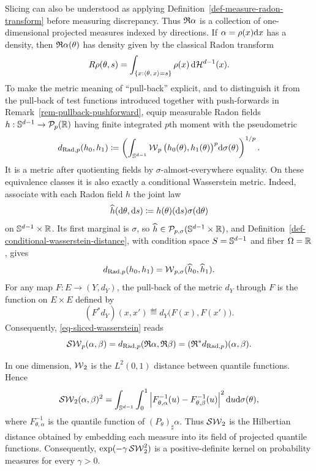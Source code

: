 	Slicing can also be understood as applying Definition~\ref{def-measure-radon-transform} before measuring discrepancy. Thus $\mathfrak R\alpha$ is a collection of one-dimensional projected measures indexed by directions. If $\alpha=\rho(x)\mathrm{d} x$ has a density, then $\mathfrak R\alpha(\theta)$ has density given by the classical Radon transform
	\[
		R\rho(\theta,s)
		=
		\int_{\{x:\langle \theta,\,x\rangle=s\}}\rho(x)\,\mathrm{d}\mathcal H^{d-1}(x).
	\]
	To make the metric meaning of ``pull-back'' explicit, and to distinguish it from the pull-back of test functions introduced together with push-forwards in Remark~\ref{rem-pullback-pushforward}, equip measurable Radon fields $h:\mathbb{S}^{d-1}\to\mathcal{P}_p(\mathbb{R})$ having finite integrated $p$th moment with the pseudometric
	\[
		d_{\mathrm{Rad},p}(h_0,h_1)
		\coloneqq
		\left(
			\int_{\mathbb{S}^{d-1}}
			\operatorname{\mathcal{W}}_p\big(h_0(\theta),h_1(\theta)\big)^p
			\mathrm{d}\sigma(\theta)
		\right)^{1/p}.
	\]
	It is a metric after quotienting fields by $\sigma$-almost-everywhere equality. On these equivalence classes it is also exactly a conditional Wasserstein metric. Indeed, associate with each Radon field $h$ the joint law
	\[
		\widehat h(\mathrm{d}\theta,\mathrm{d} s)
		\coloneqq
		h(\theta)(\mathrm{d} s)\sigma(\mathrm{d}\theta)
	\]
	on $\mathbb{S}^{d-1}\times\mathbb{R}$. Its first marginal is $\sigma$, so $\widehat h\in\mathcal{P}_{p,\sigma}(\mathbb{S}^{d-1}\times\mathbb{R})$, and Definition~\ref{def-conditional-wasserstein-distance}, with condition space $S=\mathbb{S}^{d-1}$ and fiber $\Omega=\mathbb{R}$, gives
	\[
		d_{\mathrm{Rad},p}(h_0,h_1)
		=
		\operatorname{\mathcal{W}}_{p,\sigma}(\widehat h_0,\widehat h_1).
	\]
	For any map $F:E\to(Y,d_Y)$, the pull-back of the metric $d_Y$ through $F$ is the function on $E\times E$ defined by
	\[
		(F^*d_Y)(x,x')\eqdef d_Y\big(F(x),F(x')\big).
	\]
	Consequently, \eqref{eq-sliced-wasserstein} reads
	\[
		\operatorname{\mathcal{SW}}_p(\alpha,\beta)
		=
		d_{\mathrm{Rad},p}(\mathfrak R\alpha,\mathfrak R\beta)
		=
		(\mathfrak R^*d_{\mathrm{Rad},p})(\alpha,\beta).
	\]
\begin{rem}\label{rem-sliced-hilbert-embedding}
	In one dimension, $\operatorname{\mathcal{W}}_2$ is the $L^2(0,1)$ distance between quantile functions. Hence
	\[
		\operatorname{\mathcal{SW}}_2(\alpha,\beta)^2
		=
		\int_{\mathbb{S}^{d-1}}\int_0^1
		\left\lvert F_{\theta,\alpha}^{-1}(u)-F_{\theta,\beta}^{-1}(u)\right\rvert^2
		\mathrm{d} u\mathrm{d}\sigma(\theta),
	\]
	where $F_{\theta,\alpha}^{-1}$ is the quantile function of $(P_\theta)_\sharp\alpha$. Thus $\operatorname{\mathcal{SW}}_2$ is the Hilbertian distance obtained by embedding each measure into its field of projected quantile functions. Consequently, $\exp(-\gamma\operatorname{\mathcal{SW}}_2^2)$ is a positive-definite kernel on probability measures for every $\gamma>0$.
\end{rem}

